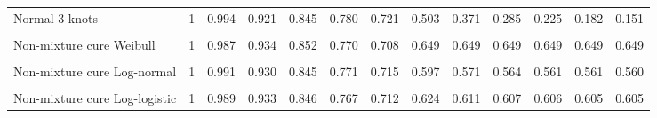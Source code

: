 \documentclass[
]{article}
\begin{document}
\begin{table}[H]
{\begin{tabular}[t]{lrrrrrrrrrrrr}
Normal 3 knots & 1 & 0.994 & 0.921 & 0.845 & 0.780 & 0.721 & 0.503 & 0.371 & 0.285 & 0.225 & 0.182 & 0.151\\
\cellcolor{gray!10}{Mixture cure Weibull} & \cellcolor{gray!10}{1} & \cellcolor{gray!10}{0.986} & \cellcolor{gray!10}{0.934} & \cellcolor{gray!10}{0.853} & \cellcolor{gray!10}{0.770} & \cellcolor{gray!10}{0.708} & \cellcolor{gray!10}{0.652} & \cellcolor{gray!10}{0.652} & \cellcolor{gray!10}{0.652} & \cellcolor{gray!10}{0.652} & \cellcolor{gray!10}{0.652} & \cellcolor{gray!10}{0.652}\\
Non-mixture cure Weibull & 1 & 0.987 & 0.934 & 0.852 & 0.770 & 0.708 & 0.649 & 0.649 & 0.649 & 0.649 & 0.649 & 0.649\\
\cellcolor{gray!10}{Mixture cure Log-normal} & \cellcolor{gray!10}{1} & \cellcolor{gray!10}{0.991} & \cellcolor{gray!10}{0.930} & \cellcolor{gray!10}{0.845} & \cellcolor{gray!10}{0.771} & \cellcolor{gray!10}{0.715} & \cellcolor{gray!10}{0.600} & \cellcolor{gray!10}{0.578} & \cellcolor{gray!10}{0.573} & \cellcolor{gray!10}{0.572} & \cellcolor{gray!10}{0.571} & \cellcolor{gray!10}{0.571}\\
Non-mixture cure Log-normal & 1 & 0.991 & 0.930 & 0.845 & 0.771 & 0.715 & 0.597 & 0.571 & 0.564 & 0.561 & 0.561 & 0.560\\
\cellcolor{gray!10}{Mixture cure Log-logistic} & \cellcolor{gray!10}{1} & \cellcolor{gray!10}{0.989} & \cellcolor{gray!10}{0.933} & \cellcolor{gray!10}{0.846} & \cellcolor{gray!10}{0.767} & \cellcolor{gray!10}{0.712} & \cellcolor{gray!10}{0.624} & \cellcolor{gray!10}{0.610} & \cellcolor{gray!10}{0.606} & \cellcolor{gray!10}{0.605} & \cellcolor{gray!10}{0.604} & \cellcolor{gray!10}{0.604}\\
Non-mixture cure Log-logistic & 1 & 0.989 & 0.933 & 0.846 & 0.767 & 0.712 & 0.624 & 0.611 & 0.607 & 0.606 & 0.605 & 0.605\\
\bottomrule
\end{tabular}}
\end{table}
\end{document}
